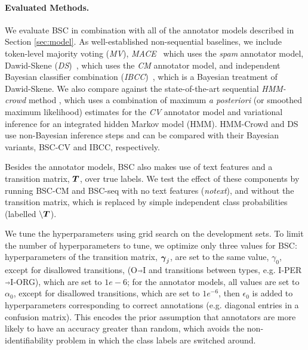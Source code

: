\paragraph{Evaluated Methods. }
We evaluate BSC in combination with all of the annotator models described in Section \ref{sec:model}.
As well-established non-sequential baselines, we include token-level majority voting (\emph{MV}), 
\emph{MACE}~\cite{hovy2013learning} which uses the \emph{spam} annotator
model,
Dawid-Skene (\emph{DS})~\cite{dawid_maximum_1979}, which uses the \emph{CM} annotator model,
 and independent Bayesian classifier combination (\emph{IBCC})~\cite{kim2012bayesian}, which is a Bayesian treatment of Dawid-Skene. 
We also compare against the state-of-the-art sequential \emph{HMM-crowd} method \cite{nguyen2017aggregating}, which uses a combination of 
maximum \emph{a posteriori} (or smoothed maximum likelihood) estimates for the \emph{CV} annotator model 
and variational inference for an integrated hidden Markov model (HMM). 
HMM-Crowd and DS use non-Bayesian inference steps and can be compared with
their Bayesian variants, BSC-CV and IBCC, respectively. 

Besides the annotator models, BSC also makes use of text features and a transition matrix, $\boldsymbol T$, over true labels.
We test the effect of these components by running BSC-CM and BSC-seq with no text features (\emph{notext}), 
and without the transition matrix, which is
 replaced by simple independent class probabilities (labelled $\backslash \boldsymbol T$).
 
We tune the hyperparameters using grid search on the development sets. To limit the number of hyperparameters to tune, 
we optimize only three values for BSC:
hyperparameters of the transition matrix, $\boldsymbol\gamma_j$, are set to the same value, 
$\gamma_0$, except for disallowed transitions, (O$\Arrow{0.2cm}$I and transitions between types, e.g. I-PER$\Arrow{0.2cm}$I-ORG), 
which are set to $1e-6$; 
for the annotator models,
all values are set to $\alpha_0$, except for disallowed transitions, which are set to $1e^{-6}$,
then $\epsilon_0$ is added to hyperparameters 
corresponding to correct annotations (e.g. diagonal entries in a confusion matrix).
This encodes the prior assumption that annotators are more likely to have an accuracy greater than random,
which avoids the non-identifiability problem in which the class labels are switched around.


